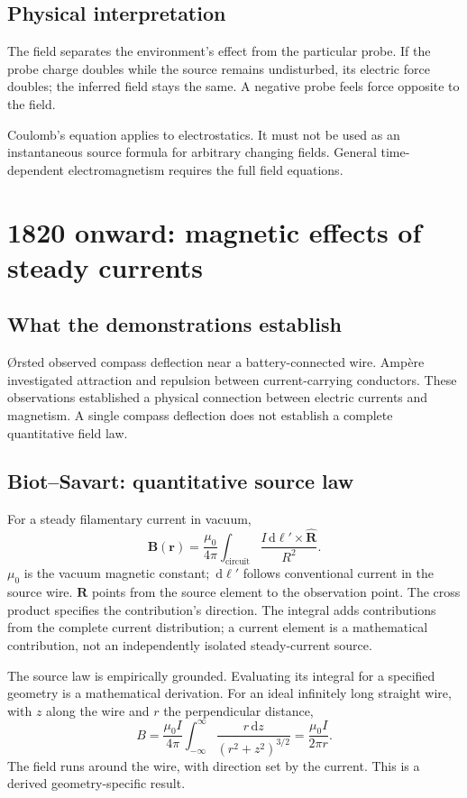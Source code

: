 \documentclass[11pt,letterpaper]{article}
\newcommand{\vect}[1]{\boldsymbol{#1}}
\newcommand{\dd}{\,\mathrm d}
\begin{document}
\subsection*{Physical interpretation}
The field separates the environment's effect from the particular probe. If the probe charge doubles while the source remains undisturbed, its electric force doubles; the inferred field stays the same. A negative probe feels force opposite to the field.

Coulomb's equation applies to electrostatics. It must not be used as an instantaneous source formula for arbitrary changing fields. General time-dependent electromagnetism requires the full field equations.

\newpage
\section{1820 onward: magnetic effects of steady currents}
\subsection*{What the demonstrations establish}
\O rsted observed compass deflection near a battery-connected wire. Amp\`ere investigated attraction and repulsion between current-carrying conductors. These observations established a physical connection between electric currents and magnetism. A single compass deflection does not establish a complete quantitative field law.\cite{amperehistory}

\subsection*{Biot--Savart: quantitative source law}
For a steady filamentary current in vacuum,
\begin{equation}
\vect B(\vect r)=\frac{\mu_0}{4\pi}
\int_{\text{circuit}}\frac{I\dd\vect\ell'\times\hat{\vect R}}{R^2}.
\end{equation}
$\mu_0$ is the vacuum magnetic constant; $\dd\vect\ell'$ follows conventional current in the source wire. $\vect R$ points from the source element to the observation point. The cross product specifies the contribution's direction. The integral adds contributions from the complete current distribution; a current element is a mathematical contribution, not an independently isolated steady-current source.\cite{biotsavart}

The source law is empirically grounded. Evaluating its integral for a specified geometry is a mathematical derivation. For an ideal infinitely long straight wire, with $z$ along the wire and $r$ the perpendicular distance,
\begin{equation}
B=\frac{\mu_0I}{4\pi}\int_{-\infty}^{\infty}
\frac{r\dd z}{(r^2+z^2)^{3/2}}
=\frac{\mu_0I}{2\pi r}.
\end{equation}
The field runs around the wire, with direction set by the current. This is a derived geometry-specific result.
\end{document}
